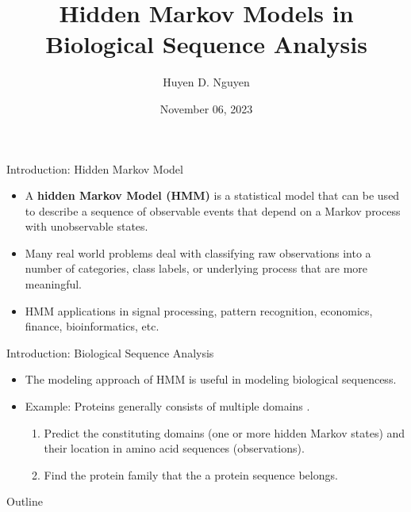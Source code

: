 \documentclass{beamer}
\title[University of Connecticut] {Hidden Markov Models in Biological Sequence Analysis}
\author{Huyen D. Nguyen}
\institute[]{University of Connecticut \\
	\medskip
	\text{Department of Statistics}\\
}
\date{November 06, 2023}
\begin{document}
\begin{frame}
	\titlepage
\end{frame}

\begin{frame}{Introduction: Hidden Markov Model}
	\begin{itemize}
		\item A \textbf{hidden Markov Model (HMM)} is a statistical model that can be used to describe a sequence of observable events that depend on a Markov process with unobservable states. 
		\item Many real world problems deal with classifying raw observations into a number of categories, class labels, or underlying process that are more meaningful.
		\item HMM applications in signal processing, pattern recognition, economics, finance, bioinformatics, etc.
	\end{itemize}
\end{frame}

\begin{frame}{Introduction: Biological Sequence Analysis}
	\begin{itemize}
		\item The modeling approach of HMM is useful in modeling biological sequencess.
		\item Example: Proteins generally consists of multiple domains \cite{yoon2009hidden}. 
		\begin{enumerate}
			\item Predict the constituting domains (one or more hidden Markov states) and their location in amino acid sequences (observations).
			\item Find the protein family that the a protein sequence belongs.
		\end{enumerate}
	\end{itemize}
\end{frame}

\begin{frame}{Outline}
	\tableofcontents
\end{frame}
\end{document}
